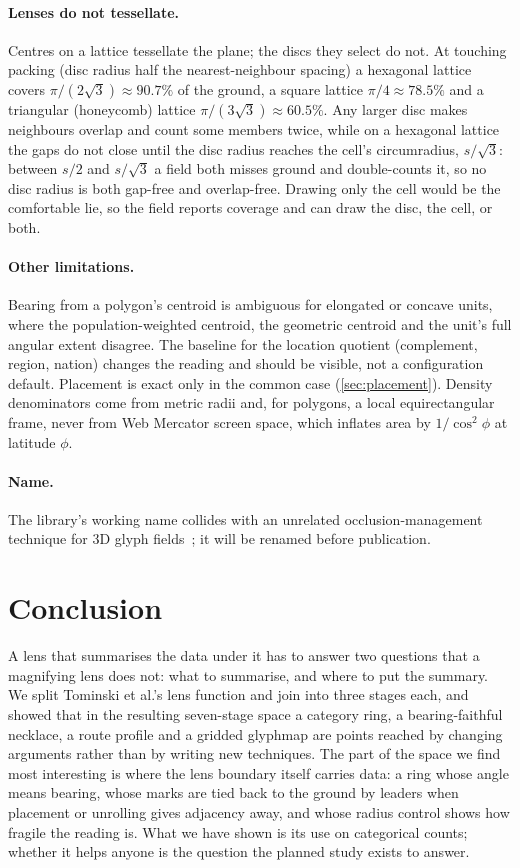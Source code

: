 \paragraph{Lenses do not tessellate.} Centres on a lattice tessellate the
plane; the discs they select do not. At touching packing (disc radius half the
nearest-neighbour spacing) a hexagonal lattice covers
$\pi/(2\sqrt3)\approx90.7\%$ of the ground, a square lattice
$\pi/4\approx78.5\%$ and a triangular (honeycomb) lattice
$\pi/(3\sqrt3)\approx60.5\%$. Any larger disc makes neighbours overlap and
count some members twice, while on a hexagonal lattice the gaps do not close
until the disc radius reaches the cell's circumradius, $s/\sqrt3$: between
$s/2$ and $s/\sqrt3$ a field both misses ground and double-counts it, so no
disc radius is both gap-free and overlap-free. Drawing only the cell would be
the comfortable lie, so the field reports coverage and can draw the disc, the
cell, or both.

\paragraph{Other limitations.} Bearing from a polygon's centroid is ambiguous
for elongated or concave units, where the population-weighted centroid, the
geometric centroid and the unit's full angular extent disagree. The baseline
for the location quotient (complement, region, nation) changes the reading and
should be visible, not a configuration default. Placement is exact only in the
common case (\cref{sec:placement}). Density denominators come from metric radii
and, for polygons, a local equirectangular frame, never from Web Mercator screen
space, which inflates area by $1/\cos^2\phi$ at latitude $\phi$.

\paragraph{Name.} The library's working name collides with an unrelated
occlusion-management technique for 3D glyph fields~\cite{tong2017glyphlens};
it will be renamed before publication.

\section{Conclusion}
\label{sec:conclusion}

A lens that summarises the data under it has to answer two questions that a
magnifying lens does not: what to summarise, and where to put the summary. We
split Tominski et al.'s lens function and join into three stages each, and
showed that in the resulting seven-stage space a category ring, a
bearing-faithful necklace, a route profile and a gridded glyphmap are points
reached by changing arguments rather than by writing new techniques. The part
of the space we find most interesting is where the lens boundary itself carries
data: a ring whose angle means bearing, whose marks are tied back to the ground
by leaders when placement or unrolling gives adjacency away, and whose radius
control shows how fragile the reading is. What we have shown is its use on
categorical counts; whether it helps anyone is the question the planned study
exists to answer.
